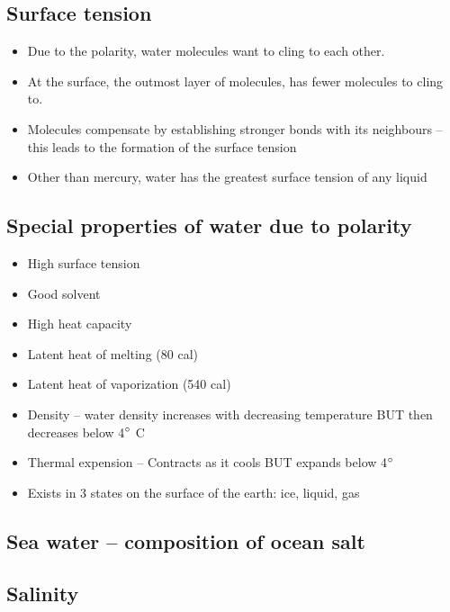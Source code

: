 \subsection{Surface tension}

\begin{itemize}
    \item Due to the polarity, water molecules want to cling
        to each other.
    \item At the surface, the outmost layer of molecules, has fewer
        molecules to cling to.
    \item Molecules compensate by establishing stronger bonds with its
        neighbours -- this leads to the formation of the surface tension
    \item Other than mercury, water has the greatest surface tension of
        any liquid
\end{itemize}

\subsection{Special properties of water due to polarity}

\begin{itemize}
    \item High surface tension
    \item Good solvent
    \item High heat capacity
    \item Latent heat of melting (80 cal)
    \item Latent heat of vaporization (540 cal)
    \item Density -- water density increases with decreasing temperature
        BUT then decreases below 4$\degree$ C
    \item Thermal expension -- Contracts as it cools BUT expands
        below 4$\degree$
    \item Exists in 3 states on the surface of the earth: ice, liquid, gas
\end{itemize}

\subsection{Sea water -- composition of ocean salt}

\subsection{Salinity}

